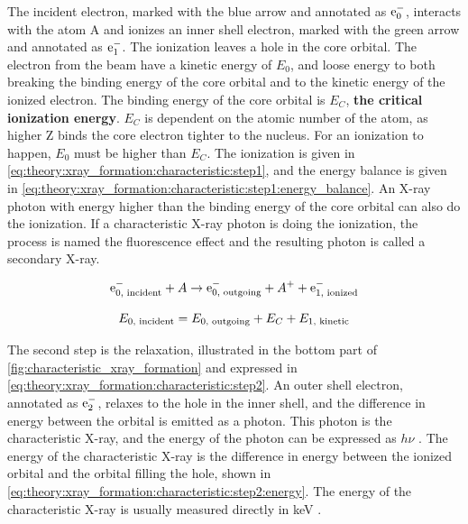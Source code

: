 The incident electron, marked with the blue arrow and annotated as $\textnormal{e}^-_{0}$, interacts with the atom A and ionizes an inner shell electron, marked with the green arrow and annotated as $\textnormal{e}^-_{1}$.
The ionization leaves a hole in the core orbital.
The electron from the beam have a kinetic energy of $E_{0}$, and loose energy to both breaking the binding energy of the core orbital and to the kinetic energy of the ionized electron.
The binding energy of the core orbital is $E_C$, \textbf{the critical ionization energy}.
$E_C$ is dependent on the atomic number of the atom, as higher Z binds the core electron tighter to the nucleus.
For an ionization to happen, $E_0$ must be higher than $E_C$.
The ionization is given in \cref{eq:theory:xray_formation:characteristic:step1}, and the energy balance is given in \cref{eq:theory:xray_formation:characteristic:step1:energy_balance}.
An X-ray photon with energy higher than the binding energy of the core orbital can also do the ionization.
If a characteristic X-ray photon is doing the ionization, the process is named the fluorescence effect and the resulting photon is called a secondary X-ray.

\begin{equation}
    \label{eq:theory:xray_formation:characteristic:step1}
    \textnormal{e}^-_{0 \textnormal{, incident}} + A \rightarrow \textnormal{e}^-_{0 \textnormal{, outgoing}} + A^+ + \textnormal{e}^-_{1 \textnormal{, ionized}}
\end{equation}

\begin{equation}
    \label{eq:theory:xray_formation:characteristic:step1:energy_balance}
    E_{0 {\textnormal{, incident}}} = E_{0 {\textnormal{, outgoing}}} + E_{C} + E_{1 {\textnormal{, kinetic}}}
\end{equation}




The second step is the relaxation, illustrated in the bottom part of \cref{fig:characteristic_xray_formation} and expressed in \cref{eq:theory:xray_formation:characteristic:step2}.
An outer shell electron, annotated as $\textnormal{e}^-_{2}$, relaxes to the hole in the inner shell, and the difference in energy between the orbital is emitted as a photon.
This photon is the characteristic X-ray, and the energy of the photon can be expressed as $h\nu$ \cite[Eq. (8.12)]{hollas_modern_2004}.
The energy of the characteristic X-ray is the difference in energy between the ionized orbital and the orbital filling the hole, shown in \cref{eq:theory:xray_formation:characteristic:step2:energy}.
The energy of the characteristic X-ray is usually measured directly in keV \cite[Eq. (4.2b)]{goldstein_scanning_2018}.


